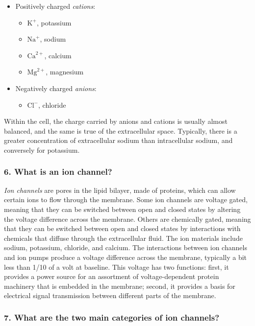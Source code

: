 \begin{itemize}
    \item Positively charged \textit{cations}:
    \begin{itemize}
        \item $\mathrm{K}^+$, potassium
        \item $\mathrm{Na}^+$, sodium 
        \item $\mathrm{Ca}^{2+}$, calcium
        \item $\mathrm{Mg}^{2+}$, magnesium
    \end{itemize}
    \item Negatively charged \textit{anions}:
    \begin{itemize}
        \item $\mathrm{Cl}^-$, chloride
    \end{itemize}
\end{itemize}
    

Within the cell, the charge carried by anions and cations is usually almost balanced, and the same is true of the extracellular space. Typically, there is a greater concentration of extracellular sodium than intracellular sodium, and conversely for potassium. 

\subsubsection{6. What is an ion channel?}

\textit{Ion channels} are pores in the lipid bilayer, made of proteins, which can allow certain ions to flow through the membrane. Some ion channels are voltage gated, meaning that they can be switched between open and closed states by altering the voltage difference across the membrane. Others are chemically gated, meaning that they can be switched between open and closed states by interactions with chemicals that diffuse through the extracellular fluid. The ion materials include sodium, potassium, chloride, and calcium. The interactions between ion channels and ion pumps produce a voltage difference across the membrane, typically a bit less than 1/10 of a volt at baseline. This voltage has two functions: first, it provides a power source for an assortment of voltage-dependent protein machinery that is embedded in the membrane; second, it provides a basis for electrical signal transmission between different parts of the membrane.

\subsubsection{7. What are the two main categories of ion channels?}

